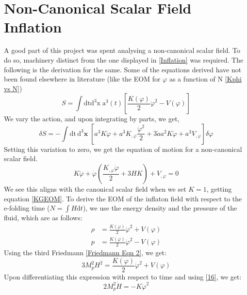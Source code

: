 \documentclass[aps,prd,reprint,preprintnumbers,showpacs,floatfix,nofootinbib,superscript address]{revtex4-2}
\begin{document}
\section{Non-Canonical Scalar Field Inflation} \label{Non-Canonical Scalar Field Inflation}

A good part of this project was spent analysing a non-canonical scalar field. To do so, machinery distinct from the one displayed in \cref{Inflation} was required. The following is the derivation for the same. Some of the equations derived have not been found elsewhere in literature (like the EOM for $\varphi$ as a function of N \cref{Kphi vs N})
\begin{equation} \label{13}
    S = \int \text{dt}\text{d}^3\text{x} \; \text{a}^3(t) \left[ \frac{K(\varphi)}{2}\dot{\varphi}^2 - V(\varphi) \right]
\end{equation}
We vary the action, and upon integrating by parts, we get,
\begin{equation}
    \delta S = - \int \text{dt}\,\text{d}^3\textbf{x} \; \left[ a^3 K \ddot{\varphi} + a^3K_{,\varphi} \frac{\dot{\varphi}^2}{2}  +  3\dot{a} a^2 K \dot{\varphi} + a^3V_{,\varphi}  \right]\delta \varphi
\end{equation}
Setting this variation to zero, we get the equation of motion for a non-canonical scalar field.
\begin{equation} \label{16}
    K \ddot{\varphi} + \dot{\varphi} \left(\frac{K_{,\varphi} \dot{\varphi}}{2} + 3H K \right) + V_{,\varphi}   = 0
\end{equation}
We see this aligns with the canonical scalar field when we set $K = 1$, getting equation \cref{KGEOM}. To derive the EOM of the inflaton field with respect to the e-folding time ($N = \int H \text{d}t$), we use the energy density and the pressure of the fluid, which are as follows: 
\begin{align}   \label{18}
    \rho &= \frac{K(\varphi)}{2} \dot{\varphi}^2 + V(\varphi) \nonumber \\
    p &= \frac{K(\varphi)}{2} \dot{\varphi}^2 - V(\varphi)
\end{align}
Using the third Friedmann \cref{Friedmann Eqn 2}, we get:
\begin{equation}    \label{19}
    3 M_p^2H^2 = \frac{K(\varphi)}{2} \dot{\varphi}^2 + V(\varphi)
\end{equation}
Upon differentiating this expression with respect to time and using \cref{16}, we get:
\begin{equation} \label{20}
    2 M_p^2 \dot{H} = -  K \dot{\varphi}^2
\end{equation}
\end{document}
